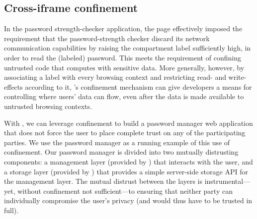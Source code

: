 
\subsection{Cross-iframe confinement}
\label{sec:system:iframe}

In the password strength-checker application, the 
page effectively imposed the requirement that the password-strength
checker discard its network communication capabilities by raising the
compartment label sufficiently high, in order to read the (labeled)
password.
%
This meets the requirement of confining untrusted code that computes
with sensitive data.
%
More generally, however, by associating a label with every browsing
context and restricting read- and write-effects according to it,
\sys{}'s confinement mechanism can give developers a means for
controlling where users' data can flow, even after the data is made
available to untrusted browsing contexts.

%
With \sys{}, we can leverage confinement to build a password manager
web application that does not force the user to place complete trust on 
any of the participating parties. We use the password manager as a
running example of this use of confinement.
%
Our password manager is divided into two mutually distrusting
components: a management layer (provided by )
that interacts with the user, 
and a storage layer (provided by ) that provides a
simple
server-side storage API for the
management layer.
%
The mutual distrust between the layers is instrumental---yet, without
confinement not sufficient---to ensuring that neither party can
individually compromise the user's privacy (and would thus have to be
trusted in full).
%

